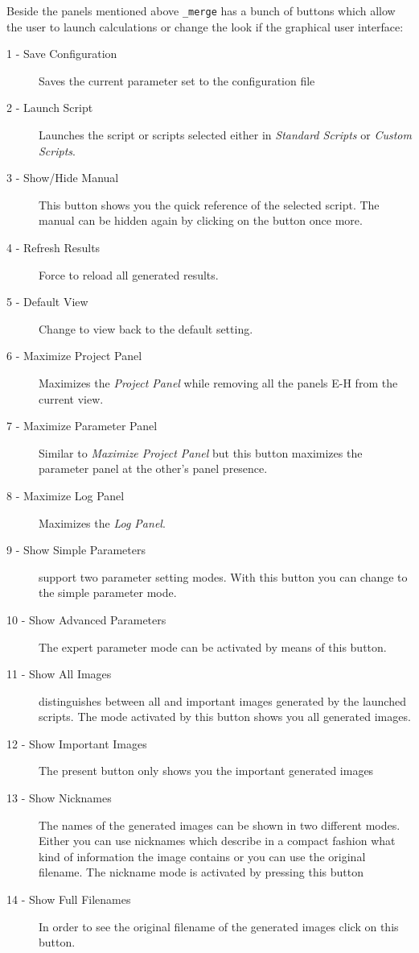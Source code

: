 Beside the panels mentioned above {\twodx}\texttt{\_merge} has a bunch of buttons which allow the user to launch calculations or change the look if the graphical user interface:

\begin{description}
	\item[1 - Save Configuration] Saves the current parameter set to the configuration file
	\item[2 - Launch Script] Launches the script or scripts selected either in \textit{Standard Scripts} or \textit{Custom Scripts}.
	\item[3 - Show/Hide Manual] This button shows you the quick reference of the selected script. The manual can be hidden again by clicking on the button once more.
	\item[4 - Refresh Results] Force {\twodx} to reload all generated results.
	\item[5 - Default View] Change to view back to the default setting.
	\item[6 - Maximize Project Panel] Maximizes the \textit{Project Panel} while removing all the panels E-H from the current view.
	\item[7 - Maximize Parameter Panel] Similar to \textit{Maximize Project Panel} but this button maximizes the parameter panel at the other's panel presence.
	\item[8 - Maximize Log Panel] Maximizes the \textit{Log Panel}.
	\item[9 - Show Simple Parameters] {\twodx} support two parameter setting modes. With this button you can change to the simple parameter mode.
	\item[10 - Show Advanced Parameters] The expert parameter mode can be activated by means of this button.
	\item[11 - Show All Images] {\twodx} distinguishes between all and important images generated by the launched scripts. The mode activated by this button shows you all generated images.
	\item[12 - Show Important Images] The present button only shows you the important generated images
	\item[13 - Show Nicknames] The names of the generated images can be shown in two different modes. Either you can use nicknames which describe in a compact fashion what kind of information the image contains or you can use the original filename. The nickname mode is activated by pressing this button
	\item[14 - Show Full Filenames] In order to see the original filename of the generated images click on this button.

\end{description}
